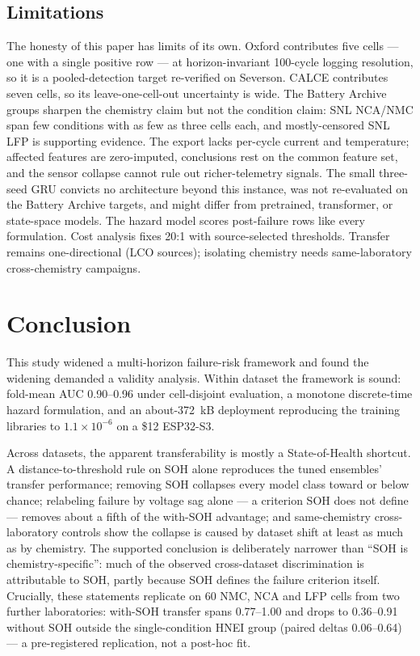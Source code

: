 \subsection{Limitations}
The honesty of this paper has limits of its own. Oxford contributes five cells --- one with a single positive row --- at horizon-invariant 100-cycle logging resolution, so it is a pooled-detection target re-verified on Severson. CALCE contributes seven cells, so its leave-one-cell-out uncertainty is wide. The Battery Archive groups sharpen the chemistry claim but not the condition claim: SNL NCA/NMC span few conditions with as few as three cells each, and mostly-censored SNL LFP is supporting evidence. The export lacks per-cycle current and temperature; affected features are zero-imputed, conclusions rest on the common feature set, and the sensor collapse cannot rule out richer-telemetry signals. The small three-seed GRU convicts no architecture beyond this instance, was not re-evaluated on the Battery Archive targets, and might differ from pretrained, transformer, or state-space models. The hazard model scores post-failure rows like every formulation. Cost analysis fixes 20:1 with source-selected thresholds. Transfer remains one-directional (LCO sources); isolating chemistry needs same-laboratory cross-chemistry campaigns.

\section{Conclusion}
This study widened a multi-horizon failure-risk framework and found the widening demanded a validity analysis. Within dataset the framework is sound: fold-mean AUC 0.90--0.96 under cell-disjoint evaluation, a monotone discrete-time hazard formulation, and an about-372~kB deployment reproducing the training libraries to $1.1\times10^{-6}$ on a \$12 ESP32-S3.

Across datasets, the apparent transferability is mostly a State-of-Health shortcut. A distance-to-threshold rule on SOH alone reproduces the tuned ensembles' transfer performance; removing SOH collapses every model class toward or below chance; relabeling failure by voltage sag alone --- a criterion SOH does not define --- removes about a fifth of the with-SOH advantage; and same-chemistry cross-laboratory controls show the collapse is caused by dataset shift at least as much as by chemistry. The supported conclusion is deliberately narrower than ``SOH is chemistry-specific'': much of the observed cross-dataset discrimination is attributable to SOH, partly because SOH defines the failure criterion itself. Crucially, these statements replicate on 60 NMC, NCA and LFP cells from two further laboratories: with-SOH transfer spans 0.77--1.00 and drops to 0.36--0.91 without SOH outside the single-condition HNEI group (paired deltas 0.06--0.64) --- a pre-registered replication, not a post-hoc fit.

